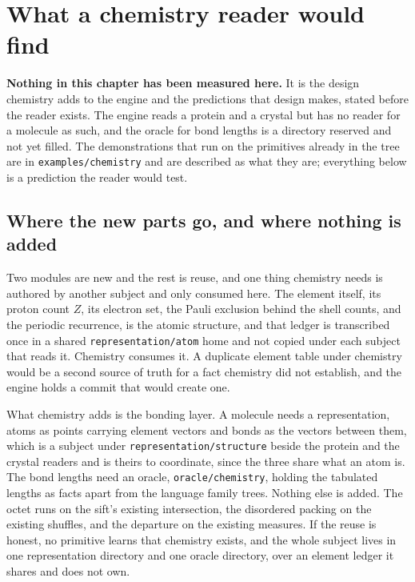 \chapter{What a chemistry reader would find}

\textbf{Nothing in this chapter has been measured here.} It is the design chemistry adds to the
engine and the predictions that design makes, stated before the reader exists. The engine reads a
protein and a crystal but has no reader for a molecule as such, and the oracle for bond lengths is a
directory reserved and not yet filled. The demonstrations that run on the primitives already in
the tree are in \texttt{examples/chemistry} and are described as what they are; everything below is a
prediction the reader would test.

\section{Where the new parts go, and where nothing is added}

Two modules are new and the rest is reuse, and one thing chemistry needs is authored by another
subject and only consumed here. The element itself, its proton count \(Z\), its electron set, the
Pauli exclusion behind the shell counts, and the periodic recurrence, is the atomic structure, and
that ledger is transcribed once in a shared \texttt{representation/atom} home and not
copied under each subject that reads it. Chemistry consumes it. A duplicate element table under
chemistry would be
a second source of truth for a fact chemistry did not establish, and the engine holds a commit that
would create one.

What chemistry adds is the bonding layer. A molecule needs a representation, atoms as points carrying
element vectors and bonds as the vectors between them, which is a subject under
\texttt{representation/structure} beside the protein and the crystal readers and is theirs to
coordinate, since the three share what an atom is. The bond lengths need an oracle,
\texttt{oracle/chemistry}, holding the tabulated lengths as facts apart from the language family
trees. Nothing else is added. The octet runs on the sift's existing intersection, the disordered
packing on the existing shuffles, and the departure on the existing measures. If the reuse is honest,
no primitive learns that chemistry exists, and the whole subject lives in one representation directory
and one oracle directory, over an element ledger it shares and does not own.

